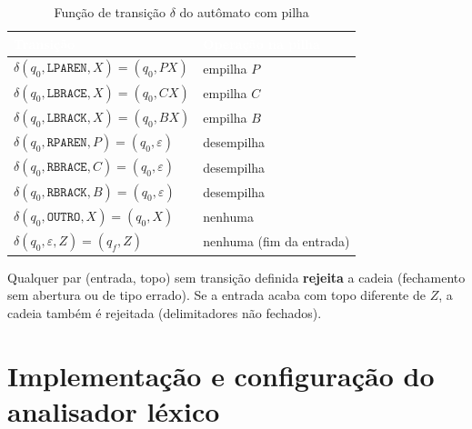 \documentclass[12pt,a4paper]{article}
\newcommand{\cab}[1]{\textcolor{white}{\bfseries #1}}
\newcommand{\fonte}{\par\vspace{3pt}{\footnotesize Fonte: elaborado por Cauan.}\par\vspace{6pt}}
\begin{document}
\begin{table}[htbp]
\centering
\small
\caption{Função de transição $\delta$ do autômato com pilha}
\begin{tabular}{|>{\raggedright\arraybackslash}p{7cm}|>{\raggedright\arraybackslash}p{5cm}|}
\hline
\rowcolor{cabecalho} \cab{Transição} & \cab{Operação na pilha} \\ \hline
$\delta(q_0, \texttt{LPAREN}, X) = (q_0, PX)$ & empilha $P$ \\ \hline
\rowcolor{faixa} $\delta(q_0, \texttt{LBRACE}, X) = (q_0, CX)$ & empilha $C$ \\ \hline
$\delta(q_0, \texttt{LBRACK}, X) = (q_0, BX)$ & empilha $B$ \\ \hline
\rowcolor{faixa} $\delta(q_0, \texttt{RPAREN}, P) = (q_0, \varepsilon)$ & desempilha \\ \hline
$\delta(q_0, \texttt{RBRACE}, C) = (q_0, \varepsilon)$ & desempilha \\ \hline
\rowcolor{faixa} $\delta(q_0, \texttt{RBRACK}, B) = (q_0, \varepsilon)$ & desempilha \\ \hline
$\delta(q_0, \texttt{OUTRO}, X) = (q_0, X)$ & nenhuma \\ \hline
\rowcolor{faixa} $\delta(q_0, \varepsilon, Z) = (q_f, Z)$ & nenhuma (fim da entrada) \\ \hline
\end{tabular}
\fonte
\end{table}

Qualquer par (entrada, topo) sem transição definida \textbf{rejeita} a cadeia (fechamento sem abertura ou de tipo errado). Se a entrada acaba com topo diferente de $Z$, a cadeia também é rejeitada (delimitadores não fechados).

\section{Implementação e configuração do analisador léxico}
\end{document}
